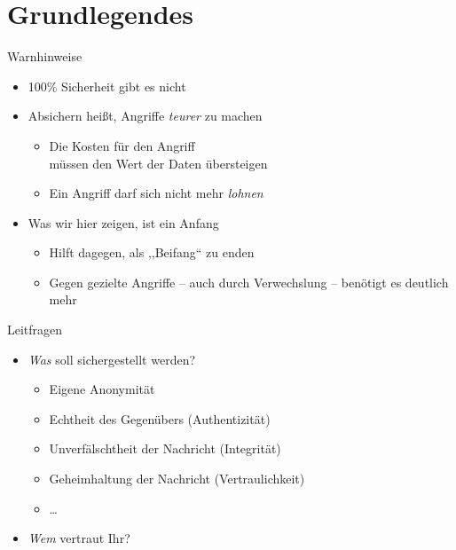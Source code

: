\section{Grundlegendes}
  \begin{frame}{Warnhinweise}
    \begin{itemize}
      \item 100\% Sicherheit gibt es nicht
      \item Absichern heißt, Angriffe \emph{teurer} zu machen
      \begin{itemize}
      \item Die Kosten für den Angriff\\ müssen den Wert der Daten übersteigen
      \item Ein Angriff darf sich nicht mehr \emph{lohnen}
      \end{itemize}
      \item Was wir hier zeigen, ist ein Anfang
      \begin{itemize}
        \item Hilft dagegen, als ,,Beifang`` zu enden
        \item Gegen gezielte Angriffe -- auch durch Verwechslung -- benötigt es deutlich mehr
      \end{itemize}
    \end{itemize}
  \end{frame}

  \begin{frame}{Leitfragen}
    \begin{itemize}
      \item \emph{Was} soll sichergestellt werden?
        \begin{itemize}
          \item Eigene Anonymität
          \item Echtheit des Gegenübers (Authentizität)
          \item Unverfälschtheit der Nachricht (Integrität)
          \item Geheimhaltung der Nachricht (Vertraulichkeit)
          \item \ldots
        \end{itemize}
      \item \emph{Wem} vertraut Ihr?
    \end{itemize}
  \end{frame}

